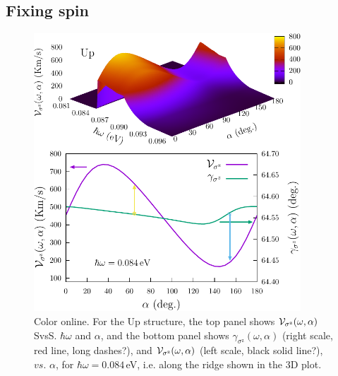 \documentclass[floatfix,prb,aps,superscriptaddress,showpacs,11pt,preprint,letterpaper]{revtex4}
\def\tama{10cm}
\begin{document}
\subsection{Fixing spin}
\label{sec:res-fixspin}

\begin{figure}[t]
\centering
\includegraphics[width=\tama]{figures/fig4}
\caption{Color online. For the Up structure, the top panel shows ${\cal
V}_{\sigma^\mathrm{z}}(\omega,\alpha)$ SvsS. $\hbar\omega$ and $\alpha$, and
the bottom panel shows $\gamma_{\sigma^\mathrm{z}}(\omega,\alpha)$ (right
scale, red line, {\color{red}long dashes?}), and ${\cal
V}_{\sigma^\mathrm{z}}(\omega,\alpha)$ (left scale, black solid
line{\color{red}?}), $vs$. $\alpha$, for $\hbar\omega=0.084$\,eV, i.e. along
the ridge shown in the 3D plot. }
\label{fig:up-vsz-w1}
\end{figure}
\end{document}
